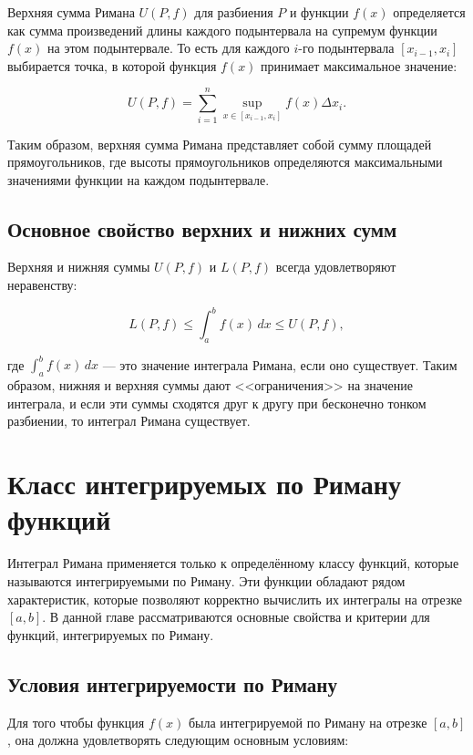 Верхняя сумма Римана \( U(P, f) \) для разбиения \( P \) и функции \( f(x) \)
определяется как сумма произведений длины каждого подынтервала на супремум
функции \( f(x) \) на этом подынтервале. То есть для каждого \( i \)-го
подынтервала \( [x_{i-1}, x_i] \) выбирается точка, в которой функция \( f(x)
\) принимает максимальное значение:

\[ U(P, f) = \sum_{i=1}^{n} \sup_{x \in [x_{i-1}, x_i]} f(x) \Delta x_i.  \]

Таким образом, верхняя сумма Римана представляет собой сумму площадей
прямоугольников, где высоты прямоугольников определяются максимальными
значениями функции на каждом подынтервале.

\subsection{Основное свойство верхних и нижних сумм}

Верхняя и нижняя суммы \( U(P, f) \) и \( L(P, f) \) всегда удовлетворяют
неравенству:

\[ L(P, f) \leq \int_a^b f(x) \, dx \leq U(P, f), \]

где \( \int_a^b f(x) \, dx \) — это значение интеграла Римана, если оно
существует. Таким образом, нижняя и верхняя суммы дают <<ограничения>> на
значение интеграла, и если эти суммы сходятся друг к другу при бесконечно
тонком разбиении, то интеграл Римана существует.

\section{Класс интегрируемых по Риману функций}

Интеграл Римана применяется только к определённому классу функций, которые
называются интегрируемыми по Риману. Эти функции обладают рядом характеристик,
которые позволяют корректно вычислить их интегралы на отрезке \( [a, b] \). В
данной главе рассматриваются основные свойства и критерии для функций,
интегрируемых по Риману.


\subsection{Условия интегрируемости по Риману}

Для того чтобы функция \( f(x) \) была интегрируемой по Риману на отрезке \(
[a, b] \), она должна удовлетворять следующим основным условиям:

